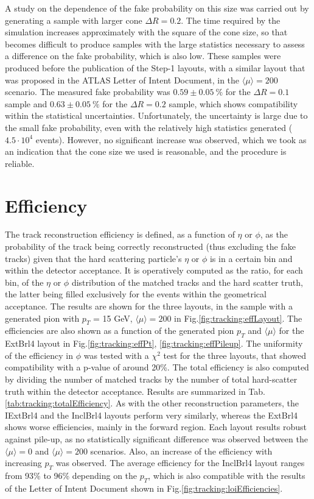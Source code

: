 \documentclass[a4paper,twoside,12pt]{book}
\begin{document}
A study on the dependence of the fake probability on this size was carried out by generating a sample with larger cone $\Delta R = 0.2$.
The time required by the simulation increases approximately with the square of the cone size, so that becomes difficult to produce samples with the large statistics necessary to assess
a difference on the fake probability, which is also low. These samples were produced before the publication of the Step-1 layouts, with a similar layout that was proposed in the
ATLAS Letter of Intent Document\cite{loi}, in the $\langle\mu\rangle = 200$ scenario. The measured fake probability was $0.59 \pm 0.05\ \%$ for the $\Delta R = 0.1$ sample and $0.63 \pm 0.05\ \%$ for
the $\Delta R = 0.2$ sample,
which shows compatibility within the statistical uncertainties. Unfortunately, the uncertainty is large due to the small fake probability, even with the relatively high statistics generated ($4.5\cdot 10^{4}$
events). However, no significant increase was observed, which we took as an indication that the cone size we used is reasonable, and the procedure is reliable.

\section{Efficiency}
The track reconstruction efficiency is defined, as a function of $\eta$ or $\phi$, as the probability of the track being correctly reconstructed (thus excluding the fake tracks) given that
the hard scattering particle's $\eta$ or $\phi$ is in a certain bin and within the detector acceptance. It is operatively computed as the ratio, for each bin, of the $\eta$ or $\phi$ distribution
of the matched tracks and the hard scatter truth, the latter being filled exclusively for the events within the geometrical acceptance. The results are shown for the three layouts, in the
sample with a generated pion with $p_{T}$ = 15 GeV, $\langle\mu\rangle = 200$ in Fig.\ref{fig:tracking:effLayout}. The efficiencies are also shown as a function of the generated pion $p_{T}$ and $\langle\mu\rangle$ for the ExtBrl4 layout in Fig.\ref{fig:tracking:effPt}, \ref{fig:tracking:effPileup}. The uniformity of the efficiency in $\phi$ was tested with a $\chi^{2}$ test for the three layouts, that 
showed compatibility with a p-value of around 20\%. The total efficiency is also computed by dividing the number of matched tracks by the number of total hard-scatter truth within
the detector acceptance. Results are summarized in Tab.\ref{tab:tracking:totalEfficiency}. As with the other reconstruction parameters, the IExtBrl4 and the InclBrl4 layouts perform
very similarly, whereas the ExtBrl4 shows worse efficiencies, mainly in the forward region.
Each layout results robust against pile-up, as no statistically significant difference was observed between the $\langle\mu\rangle = 0$ and $\langle\mu\rangle = 200$ scenarios. Also, an increase of the efficiency with increasing $p_{T}$ was observed. The average efficiency
for the InclBrl4 layout ranges from 93\% to 96\% depending on the $p_{T}$, which is also
compatible with the results of the Letter of Intent Document\cite{loi} shown in Fig.\ref{fig:tracking:loiEfficiencies}.
\end{document}
